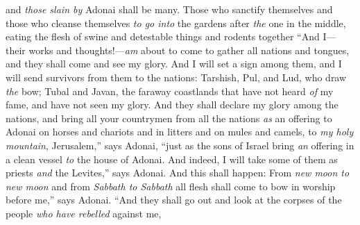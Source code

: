\begin{biblechapter}
and \textit{those slain by} Adonai shall be many.
\verse Those who sanctify themselves 
and those who cleanse themselves \textit{to go into} the gardens after \textit{the} one in the middle, 
eating the flesh of swine 
and detestable things and rodents together
\verse “And I—their works and thoughts!—\textit{am} about to come to gather all nations and tongues, 
and they shall come and see my glory.
\verse And I will set a sign among them, 
and I will send survivors from them to the nations: 
Tarshish, Pul, and Lud, who draw \textit{the} bow; 
Tubal and Javan, the faraway coastlands 
that have not heard \textit{of} my fame, 
and have not seen my glory.
\verse And they shall declare my glory among the nations,
\verse and bring all your countrymen from all the nations \textit{as} an offering to Adonai on horses and chariots and in litters and on mules and camels, to \textit{my holy mountain}, Jerusalem,” says Adonai, “just as the sons of Israel bring \textit{an} offering in a clean vessel \textit{to} the house of Adonai.
\verse And indeed, I will take some of them as priests \textit{and} the Levites,” says Adonai.
\verse And this shall happen: From \textit{new moon to new moon} and from \textit{Sabbath to Sabbath} all flesh shall come to bow in worship before me,” says Adonai.
\verse “And they shall go out and look at the corpses of the people \textit{who have rebelled} against me,
\end{biblechapter}


